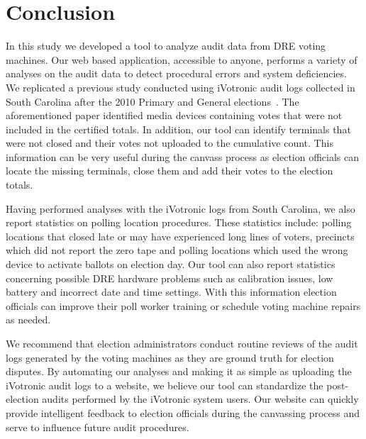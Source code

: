 \section{Conclusion}
In this study we developed a tool to analyze audit data from DRE voting machines. Our web based application, accessible to anyone, performs a variety of analyses on the audit data to detect procedural errors and system deficiencies. We replicated a previous study conducted using iVotronic audit logs collected in South Carolina after the 2010 Primary and General elections~\cite{Buell2010}. The aforementioned paper identified media devices containing votes that were not included in the certified totals. In addition, our tool can identify terminals that were not closed and their votes not uploaded to the cumulative count. This information can be very useful during the canvass process as election officials can locate the missing terminals, close them and add their votes to the election totals. 

Having performed analyses with the iVotronic logs from South Carolina, we also report statistics on polling location procedures. These statistics include: polling locations that closed late or may have experienced long lines of voters, precincts which did not report the zero tape and polling locations which used the wrong device to activate ballots on election day. Our tool can also report statistics concerning possible DRE hardware problems such as calibration issues, low battery and incorrect date and time settings. With this information election officials can improve their poll worker training or schedule voting machine repairs as needed.

We recommend that election administrators conduct routine reviews of the audit logs generated by the voting machines as they are ground truth for election disputes. By automating our analyses and making it as simple as uploading the iVotronic audit logs to a website, we believe our tool can standardize the post-election audits performed by the iVotronic system users. Our website can quickly provide intelligent feedback to election officials during the canvassing process and serve to influence future audit procedures. 
